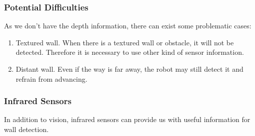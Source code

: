 \documentclass[a4paper]{scrartcl}
\begin{document}
\subsubsection{Potential Difficulties}
As we don't have the depth information, there can exist some problematic cases:
\begin{enumerate}
    \item Textured wall. When there is a textured wall or obstacle, it will not be detected. Therefore it is necessary to use other kind of sensor information.
    \item Distant wall. Even if the way is far away, the robot may still detect it and refrain from advancing.
\end{enumerate}

\subsubsection{Infrared Sensors}
In addition to vision, infrared sensors can provide us with useful information for wall detection. 

\end{document}
